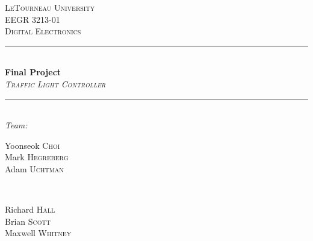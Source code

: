 \begin{titlepage}
\newcommand{\HRule}{\rule{\linewidth}{0.4mm}} %

\centering %


\textsc{\LARGE LeTourneau University}\\[1.5cm] %
\textsc{\Large EEGR 3213-01}\\[0.5cm] %
\textsc{\large Digital Electronics}\\[0.5cm] %


\HRule \\[0.4cm]
{\huge \bfseries Final Project}\\[2mm]
{\Large \slshape \scshape Traffic Light Controller} %
\HRule \\[2cm]

\emph{\Large Team:}\\[1cm]
\begin{minipage}{0.35\textwidth}
	\begin{flushleft} \Large
      Yoonseok \textsc{Choi}\\
      Mark \textsc{Hegreberg}\\
      Adam \textsc{Uchtman}
	\end{flushleft}
\end{minipage}
~
\begin{minipage}{0.35\textwidth}
	\begin{flushright} \Large
		Richard \textsc{Hall}\\
      Brian \textsc{Scott}\\
      Maxwell \textsc{Whitney}
	\end{flushright}
\end{minipage}\\[2cm]


\end{titlepage}
